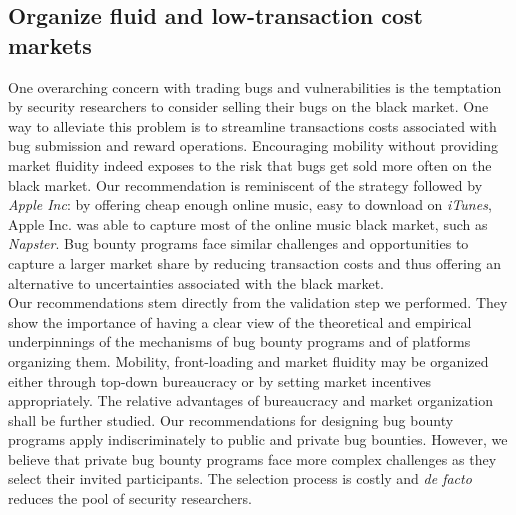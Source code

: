 \subsection{Organize fluid and low-transaction cost markets}
One overarching concern with trading bugs and vulnerabilities is the temptation by security researchers to consider selling their bugs on the black market. One way to alleviate this problem is to streamline transactions costs associated with bug submission and reward operations. Encouraging mobility without providing market fluidity indeed exposes to the risk that bugs get sold more often on the black market. Our recommendation is reminiscent of the strategy followed by {\it Apple Inc}: by offering cheap enough online music, easy to download on {\it iTunes}, Apple Inc. was able to capture most of the online music black market, such as {\it Napster}. Bug bounty programs face similar challenges and opportunities to capture a larger market share by reducing transaction costs and thus offering an alternative to uncertainties associated with the black market.\\


Our recommendations stem directly from the validation step we performed. They show the importance of having a clear view of the theoretical and empirical underpinnings of the mechanisms of bug bounty programs and of platforms organizing them. Mobility, front-loading and market fluidity may be organized either through top-down bureaucracy or by setting market incentives appropriately. The relative advantages of bureaucracy and market organization shall be further studied. Our recommendations for designing bug bounty programs apply indiscriminately to public and private bug bounties. However, we believe that private bug bounty programs face more complex challenges as they select their invited participants. The selection process is costly and {\it de facto} reduces the pool of security researchers.\\



